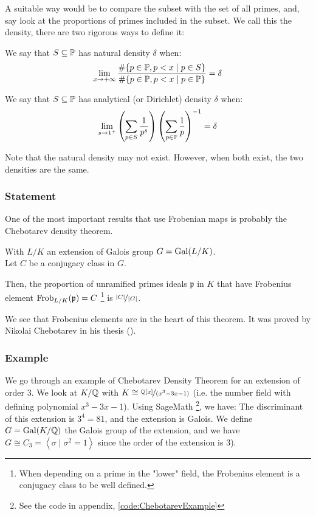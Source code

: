 A suitable way would be to compare the subset with the set of all primes, and, say look at the proportions of primes included in the subset.
We call this the density, there are two rigorous ways to define it:
\begin{definition}
	We say that $S \subseteq \mathbb{P}$ has natural density $\delta$ when:
	$$
	\lim_{x \to +\infty}
	\frac{ \# \{ p \in \mathbb{P}, p < x \mid p \in S \}}
	{ \# \{ p \in \mathbb{P}, p < x \mid p \in \mathbb{P} \}} = \delta
	$$
\end{definition}
\begin{definition}
	We say that $S \subseteq \mathbb{P}$ has analytical (or Dirichlet) density $\delta$ when:
	$$
	\lim_{s \to 1^+}
	\left( \sum_{p \in S} \frac{1}{p^s} \right) 
	\left( \sum_{p \in \mathbb{P}} \frac{1}{p} \right)^{-1} = \delta
	$$
\end{definition}

Note that the natural density may not exist.
However, when both exist, the two densities are the same.



\subsubsection{Statement}
One of the most important results that use Frobenian maps is probably the Chebotarev density theorem.
\begin{theorem}
	With $L/K$ an extension of Galois group $G=\text{Gal}(L/K)$.\\
	Let $C$ be a conjugacy class in $G$.
	
	Then, the proportion of unramified primes ideals $\mathfrak{p}$ in $K$ that have Frobenius element $\text{Frob}_{L/K}(\mathfrak{p})=C$ \footnote{When depending on a prime in the "lower" field, the Frobenius element is a conjugacy class to be well defined.} is $\nicefrac{|C|}{|G|}$.
\end{theorem}
We see that Frobenius elements are in the heart of this theorem.
It was proved by Nikolai Chebotarev in his thesis (\cite{ChebotarevTheorem}).

\subsubsection{Example}
We go through an example of Chebotarev Density Theorem for an extension of order 3.
We look at $K/\mathbb{Q}$ with $K \cong \nicefrac{\mathbb{Q}[x]}{(x^3-3x-1)}$ (i.e. the number field with defining polynomial $x^3 - 3x - 1$).
Using SageMath \footnote{See the code in appendix, \ref{code:ChebotarevExample}}, we have:
The discriminant of this extension is $3^4=81$, and the extension is Galois.
We define $G = \text{Gal}(K/\mathbb{Q})$ the Galois group of the extension, and we have $G \cong C_3 = \left\langle \sigma \mid \sigma^2 = 1 \right\rangle $ since the order of the extension is 3).

